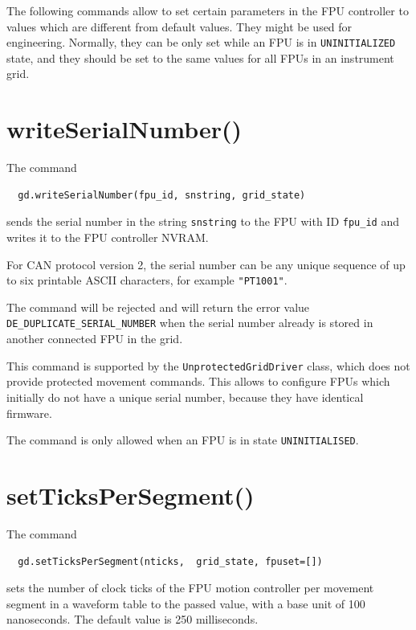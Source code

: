\documentclass[fontsize=12,a4paper]{scrreprt}
\begin{document}
The following commands allow to set certain parameters in the FPU
controller to values which are different from default values.  They
might be used for engineering. Normally, they can be only set while an
FPU is in \texttt{UNINITIALIZED} state, and they should be set to the
same values for all FPUs in an instrument grid.



\section{writeSerialNumber()}

The command
\begin{verbatim}
  gd.writeSerialNumber(fpu_id, snstring, grid_state)
\end{verbatim}
sends the serial number in the string \texttt{snstring}
to the FPU with ID \texttt{fpu\_id} and writes it
to the FPU controller NVRAM.

For CAN protocol version 2, the serial number can be any unique
sequence of up to six printable ASCII characters, for example
\texttt{"PT1001"}.

\begin{sloppypar}
 The command will be rejected and
will return the error value \texttt{DE\_DUPLICATE\_SERIAL\_NUMBER}
when the serial number already is stored in another connected FPU in
the grid.
\end{sloppypar}

This command is supported by the \texttt{UnprotectedGridDriver} class,
which does not provide protected movement commands. This allows to
configure FPUs which initially do not have a unique serial number,
because they have identical firmware.

The command is only allowed when an FPU is in state \texttt{UNINITIALISED}.

\section{setTicksPerSegment()}
\label{sec:setTickPerSegment}

The command
\begin{verbatim}
  gd.setTicksPerSegment(nticks,  grid_state, fpuset=[])
\end{verbatim}
sets the number of clock ticks of the FPU motion controller per
movement segment in a waveform table to the passed value, with a base
unit of 100 nanoseconds. The default value is 250 milliseconds.
\end{document}
